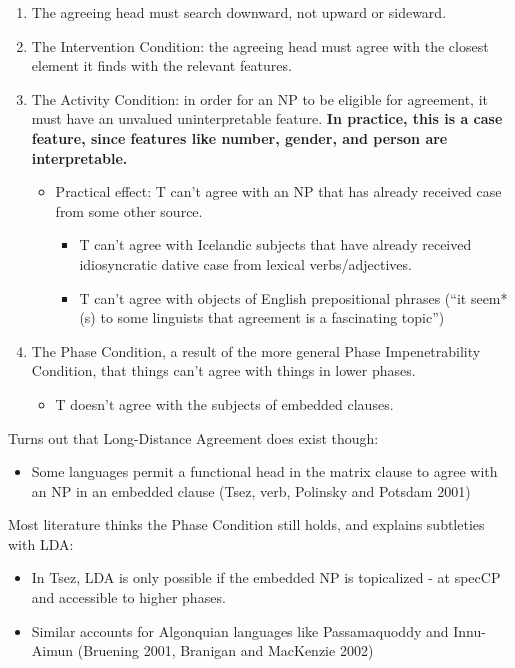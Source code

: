 \begin{enumerate}
  \item The agreeing head must search downward, not upward or sideward.
  \item The Intervention Condition: the agreeing head must agree with the closest element it finds with the relevant features.
  \item The Activity Condition: in order for an NP to be eligible for agreement, it must have an unvalued uninterpretable feature. \textbf{In practice, this is a case feature, since features like number, gender, and person are interpretable.}
  \begin{itemize}
    \item Practical effect: T can't agree with an NP that has already received case from some other source.
    \begin{itemize}
      \item T can't agree with Icelandic subjects that have already received idiosyncratic dative case from lexical verbs/adjectives.
      \item T can't agree with objects of English prepositional phrases (``it seem*(s) to some linguists that agreement is a fascinating topic'')
    \end{itemize}
  \end{itemize}
  \item The Phase Condition, a result of the more general Phase Impenetrability Condition, that things can't agree with things in lower phases.
  \begin{itemize}
    \item T doesn't agree with the subjects of embedded clauses.
  \end{itemize}
\end{enumerate}

Turns out that Long-Distance Agreement does exist though:

\begin{itemize}
  \item Some languages permit a functional head in the matrix clause to agree with an NP in an embedded clause (Tsez, verb, Polinsky and Potsdam 2001)
\end{itemize}

Most literature thinks the Phase Condition still holds, and explains subtleties with LDA:

\begin{itemize}
  \item In Tsez, LDA is only possible if the embedded NP is topicalized - at specCP and accessible to higher phases.
  \item Similar accounts for Algonquian languages like Passamaquoddy and Innu-Aimun (Bruening 2001, Branigan and MacKenzie 2002)
\end{itemize}


